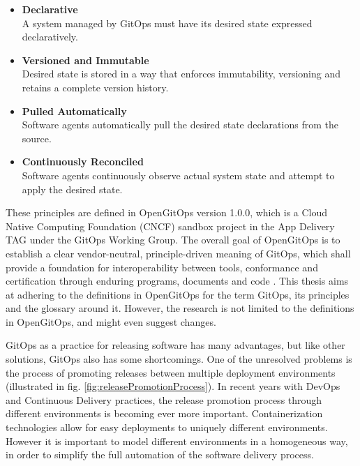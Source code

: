 \begin{itemize}
	\item \textbf{Declarative} \\
		A system managed by GitOps must have its desired state expressed declaratively.
	\item \textbf{Versioned and Immutable} \\
		Desired state is stored in a way that enforces immutability, versioning and retains a complete version history.
	\item \textbf{Pulled Automatically} \\
		Software agents automatically pull the desired state declarations from the source.
	\item \textbf{Continuously Reconciled} \\
		Software agents continuously observe actual system state and attempt to apply the desired state.
\end{itemize}


\noindent
These principles are defined in OpenGitOps version 1.0.0,
which is a Cloud Native Computing Foundation (CNCF) sandbox project
in the App Delivery TAG 
under the GitOps Working Group.
The overall goal of OpenGitOps is to establish a clear vendor-neutral,
principle-driven meaning of GitOps,
which shall provide a foundation for interoperability between tools, conformance and certification through enduring programs, documents and code
\autocite{opengitopsDocuments}.
This thesis aims at adhering to the definitions in OpenGitOps
for the term GitOps, its principles and the glossary around it.
However, the research is not limited to the definitions in OpenGitOps,
and might even suggest changes.





\noindent
GitOps as a practice for releasing software has many advantages,
but like other solutions, GitOps also has some shortcomings.
One of the unresolved problems is
the process of promoting releases between multiple deployment environments (illustrated in fig. \ref{fig:releasePromotionProcess}).
In recent years with DevOps and Continuous Delivery practices,
the release promotion process through different environments is becoming ever more important.
Containerization technologies allow for easy deployments to
uniquely different environments.
However it is important to model different environments in
a homogeneous way,
in order to simplify the full automation of the software delivery process.

